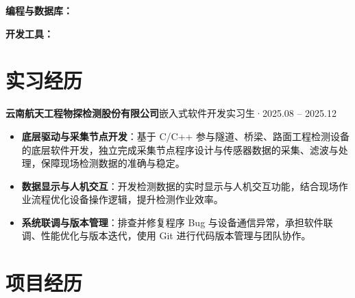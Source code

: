 \documentclass[10pt,a4paper]{article}
\begin{document}
\vspace{2pt}

{\bfseries\color{primary}编程与数据库：}

\vspace{2pt}

{\bfseries\color{primary}开发工具：}

\section{\faBriefcase\hspace{0.4em}实习经历}

{\bfseries 云南航天工程物探检测股份有限公司}\hfill{\color{graytext}嵌入式软件开发实习生\hspace{0.3em}·\hspace{0.3em}2025.08 -- 2025.12}

\vspace{2pt}

\begin{itemize}[leftmargin=1.5em, itemsep=1.5pt, parsep=0pt, topsep=1.5pt]
    \item \textbf{底层驱动与采集节点开发}：基于 C/C++ 参与隧道、桥梁、路面工程检测设备的底层软件开发，独立完成采集节点程序设计与传感器数据的采集、滤波与处理，保障现场检测数据的准确与稳定。
    \item \textbf{数据显示与人机交互}：开发检测数据的实时显示与人机交互功能，结合现场作业流程优化设备操作逻辑，提升检测作业效率。
    \item \textbf{系统联调与版本管理}：排查并修复程序 Bug 与设备通信异常，承担软件联调、性能优化与版本迭代，使用 Git 进行代码版本管理与团队协作。
\end{itemize}

\vspace{0.06em}

\section{\faProjectDiagram\hspace{0.4em}项目经历}
\end{document}

